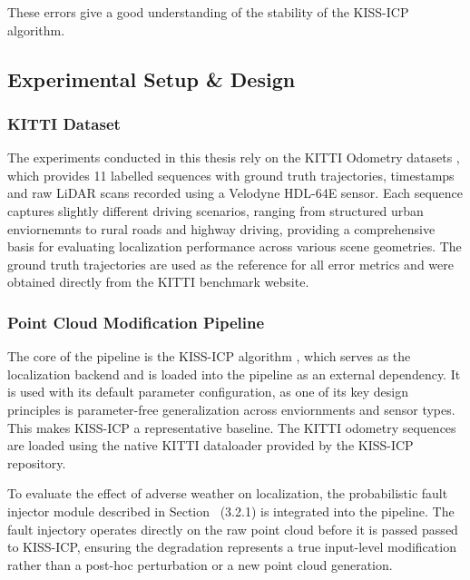 These errors give a good understanding of the stability of the KISS-ICP algorithm. 

\subsection{Experimental Setup \& Design}

\subsubsection{KITTI Dataset}

The experiments conducted in this thesis rely on the KITTI Odometry datasets \cite{noauthor_kitti_nodate}
, which provides 11 labelled sequences with ground truth trajectories, timestamps and raw LiDAR scans recorded using a Velodyne HDL-64E sensor. Each sequence captures slightly different driving scenarios, ranging from structured urban enviornemnts to rural roads and highway driving, providing a comprehensive basis for evaluating localization performance across various scene geometries. The ground truth trajectories are used as the reference for all error metrics and were obtained directly from  the KITTI benchmark website. 


\subsubsection{Point Cloud Modification Pipeline}

The core of the pipeline is the KISS-ICP algorithm \cite{vizzo_kiss-icp_2023}, which serves as the localization backend and is loaded into the pipeline as an external dependency. It is used with its default parameter configuration, as one of its key design principles is parameter-free generalization across enviornments and sensor types. This makes KISS-ICP a representative baseline. The KITTI odometry sequences are loaded using the native KITTI dataloader provided by the KISS-ICP repository. 

To evaluate the effect of adverse weather on localization, the probabilistic fault injector module described in Section ~(3.2.1) is integrated into the pipeline. The fault injectory operates directly on the raw point cloud before it is passed passed to KISS-ICP, ensuring the degradation represents a true input-level modification rather than a post-hoc perturbation or a new point cloud generation. 

